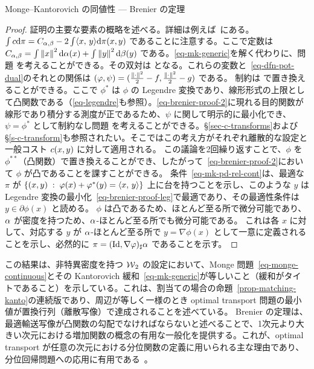 \begin{rem2}{Monge--Kantorovich の同値性 --- Brenier の定理}
\begin{proof}
	証明の主要な要素の概略を述べる。詳細は例えば~\citep{SantambrogioBook}にある。
	$\int c \mathrm{d}\pi = C_{\alpha,\beta} - 2 \int \langle x,\,y\rangle\mathrm{d}\pi(x,y)$ であることに注意する。ここで定数は $C_{\alpha,\beta} = \int \left\| x \right\|^2\mathrm{d}\alpha(x) + \int \left\| y \right\|^2\mathrm{d}\beta(y)$ である。\eqref{eq-mk-generic}を解く代わりに、問題
	を考えることができる。その双対は
	となる。これらの変数と~\eqref{eq-dfn-pot-dual}のそれとの関係は
	$(\varphi,\psi) = (\frac{\left\| \cdot \right\|^2}{2}-f,\frac{\left\| \cdot \right\|^2}{2}-g)$ である。
	制約は
	で置き換えることができる。ここで $\phi^*$ は $\phi$ の Legendre 変換であり、線形形式の上限として凸関数である（\eqref{eq-legendre}も参照）。\eqref{eq-brenier-proof-2}に現れる目的関数が線形であり積分する測度が正であるため、$\psi$ に関して明示的に最小化でき、$\psi=\phi^*$ として制約なし問題
	\eql{\label{eq-brenier-proof-2}
		\umin{\phi} \int_\X \phi \d\al + \int_\Y \phi^* \d\be
	}
	を考えることができる。\S\ref{sec-c-transforms}および\S\ref{s-c-transform}も参照されたい。そこではこの考え方がそれぞれ離散的な設定と一般コスト $c(x,y)$ に対して適用される。
	この議論を2回繰り返すことで、$\phi$ を $\phi^{**}$（凸関数）で置き換えることができ、したがって~\eqref{eq-brenier-proof-2}において $\phi$ が凸であることを課すことができる。
	条件~\eqref{eq-mk-pd-rel-cont}は、最適な $\pi$ が $\left\{ (x,y) \;:\; \varphi(x)+\varphi^*(y)=\langle x,\,y\rangle \right\}$ 上に台を持つことを示し、このような $y$ は Legendre 変換の最小化~\eqref{eq-brenier-proof-leg}で最適であり、その最適性条件は $y \in \partial \phi(x)$ と読める。
	$\phi$ は凸であるため、ほとんど至る所で微分可能であり、$\alpha$ が密度を持つため、$\alpha$-ほとんど至る所でも微分可能である。
	これは各 $x$ に対して、対応する $y$ が $\alpha$-ほとんど至る所で $y = \nabla\phi(x)$ として一意に定義されることを示し、必然的に $\pi = (\mathrm{Id},\nabla\varphi)_\sharp \alpha$ であることを示す。
\end{proof}

この結果は、非特異密度を持つ $\operatorname{\mathcal{W}}_2$ の設定において、Monge 問題~\eqref{eq-monge-continuous}とその Kantorovich 緩和~\eqref{eq-mk-generic}が等しいこと（緩和がタイトであること）を示している。これは、割当ての場合の命題~\ref{prop-matching-kanto}の連続版であり、周辺が等しく一様のとき optimal transport 問題の最小値が置換行列（離散写像）で達成されることを述べている。
%
Brenier の定理は、最適輸送写像が凸関数の勾配でなければならないと述べることで、1次元より大きい次元における増加関数の概念の有用な一般化を提供する。これが、optimal transport が任意の次元における分位関数の定義に用いられる主な理由であり、分位回帰問題への応用に有用である~\citep{carlier2016vector}。


\end{rem2}
